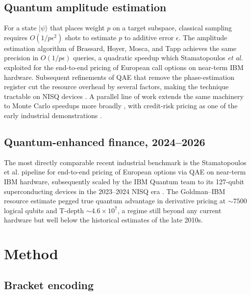 \documentclass[11pt]{article}
\begin{document}
\subsection{Quantum amplitude estimation}

For a state $|\psi\rangle$ that places weight $p$ on a target
subspace, classical sampling requires $O(1/p\epsilon^2)$ shots to
estimate $p$ to additive error $\epsilon$. The amplitude estimation
algorithm of Brassard, Hoyer, Mosca, and Tapp
\cite{brassard2002quantum} achieves the same precision in
$O(1/p\epsilon)$ queries, a quadratic speedup which Stamatopoulos
\textit{et al.} \cite{stamatopoulos2020option} exploited for the
end-to-end pricing of European call options on near-term IBM hardware.
Subsequent refinements of QAE that remove the phase-estimation
register \cite{suzuki2020amplitude} cut the resource overhead by
several factors, making the technique tractable on NISQ devices
\cite{preskill2018nisq, bharti2022nisq}. A parallel line of work
extends the same machinery to Monte Carlo speedups more broadly
\cite{montanaro2015quantum}, with credit-risk pricing as one of the
early industrial demonstrations \cite{egger2020option}.

\subsection{Quantum-enhanced finance, 2024--2026}

The most directly comparable recent industrial benchmark is the
Stamatopoulos et al. \cite{stamatopoulos2020option} pipeline for
end-to-end pricing of European options via QAE on near-term IBM
hardware, subsequently scaled by the IBM Quantum team to its
127-qubit superconducting devices in the 2023--2024 NISQ era
\cite{bharti2022nisq}. The Goldman--IBM
resource estimate \cite{goldman_ibm_2021} pegged true quantum
advantage in derivative pricing at $\sim 7500$ logical qubits and
T-depth $\sim 4.6 \times 10^7$, a regime still beyond any current
hardware but well below the historical estimates of the late 2010s.

\section{Method}
\label{sec:method}

\subsection{Bracket encoding}
\end{document}
